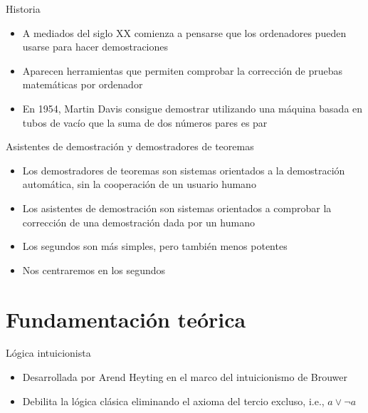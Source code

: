 \documentclass[10pt]{beamer}
\begin{document}
\begin{frame}{Historia}

  \begin{itemize}
  \item A mediados del siglo XX comienza a pensarse que los
    ordenadores pueden usarse para hacer demostraciones
  \item Aparecen herramientas que permiten comprobar la corrección de
    pruebas matemáticas por ordenador
  \item En 1954, Martin Davis consigue demostrar utilizando una
    máquina basada en tubos de vacío que la suma de dos números pares
    es par
  \end{itemize}

\end{frame}

\begin{frame}{Asistentes de demostración y demostradores de teoremas}

  \begin{itemize}
  \item Los demostradores de teoremas son sistemas orientados a la
    demostración automática, sin la cooperación de un usuario humano
  \item Los asistentes de demostración son sistemas orientados a
    comprobar la corrección de una demostración dada por un humano
  \item Los segundos son más simples, pero también menos potentes
  \item Nos centraremos en los segundos
  \end{itemize}

\end{frame}

\section{Fundamentación teórica}

\begin{frame}[fragile]{Lógica intuicionista}

  \begin{itemize}
  \item Desarrollada por Arend Heyting en el marco del intuicionismo
    de Brouwer
  \item Debilita la lógica clásica eliminando el axioma del tercio
    excluso, i.e., $a \lor \neg a$
  \end{itemize}

\end{frame}
\end{document}
